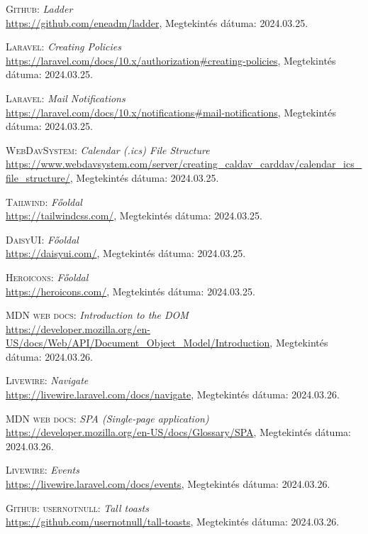 \documentclass[
]{thesis-ekf}
\theoremstyle{definition}
\theoremstyle{remark}
\begin{document}
\begin{thebibliography}{47}
\textsc{Github}: \emph{Ladder}
\\
\url{https://github.com/eneadm/ladder}, Megtekintés dátuma: 2024.03.25.

\textsc{Laravel}: \emph{Creating Policies}
\\
\url{https://laravel.com/docs/10.x/authorization#creating-policies}, Megtekintés dátuma: 2024.03.25.

\textsc{Laravel}: \emph{Mail Notifications}
\\
\url{https://laravel.com/docs/10.x/notifications#mail-notifications}, Megtekintés dátuma: 2024.03.25.

\textsc{WebDavSystem}: \emph{Calendar (.ics) File Structure}
\\
\url{https://www.webdavsystem.com/server/creating_caldav_carddav/calendar_ics_file_structure/}, Megtekintés dátuma: 2024.03.25.

\textsc{Tailwind}: \emph{Főoldal}
\\
\url{https://tailwindcss.com/}, Megtekintés dátuma: 2024.03.25.

\textsc{DaisyUI}: \emph{Főoldal}
\\
\url{https://daisyui.com/}, Megtekintés dátuma: 2024.03.25.

\textsc{Heroicons}: \emph{Főoldal}
\\
\url{https://heroicons.com/}, Megtekintés dátuma: 2024.03.25.

\textsc{MDN web docs}: \emph{Introduction to the DOM}
\\
\url{https://developer.mozilla.org/en-US/docs/Web/API/Document_Object_Model/Introduction}, Megtekintés dátuma: 2024.03.26.

\textsc{Livewire}: \emph{Navigate}
\\
\url{https://livewire.laravel.com/docs/navigate}, Megtekintés dátuma: 2024.03.26.

\textsc{MDN web docs}: \emph{SPA (Single-page application)}
\\
\url{https://developer.mozilla.org/en-US/docs/Glossary/SPA}, Megtekintés dátuma: 2024.03.26.

\textsc{Livewire}: \emph{Events}
\\
\url{https://livewire.laravel.com/docs/events}, Megtekintés dátuma: 2024.03.26.

\textsc{Github: usernotnull}: \emph{Tall toasts}
\\
\url{https://github.com/usernotnull/tall-toasts}, Megtekintés dátuma: 2024.03.26.


\end{thebibliography}
\end{document}
